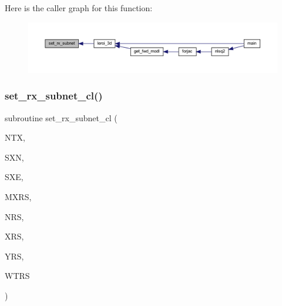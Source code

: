 Here is the caller graph for this function\+:\nopagebreak
\begin{figure}[H]
\begin{center}
\leavevmode
\includegraphics[width=350pt]{Leroi_8f90_a9100f1607055290b050e961c8027016a_icgraph}
\end{center}
\end{figure}
\mbox{\label{Leroi_8f90_a805e33739aa8ba4bfe42148473309ce0}} 
\subsubsection{\texorpdfstring{set\+\_\+rx\+\_\+subnet\+\_\+cl()}{set\_rx\_subnet\_cl()}}
{\footnotesize\ttfamily subroutine set\+\_\+rx\+\_\+subnet\+\_\+cl (\begin{DoxyParamCaption}\item[{integer}]{N\+TX,  }\item[{real, dimension (4,ntx)}]{S\+XN,  }\item[{real, dimension (4,ntx)}]{S\+XE,  }\item[{integer}]{M\+X\+RS,  }\item[{integer, dimension(1,ntx)}]{N\+RS,  }\item[{real, dimension (mxrs,1,ntx)}]{X\+RS,  }\item[{real, dimension (mxrs,1,ntx)}]{Y\+RS,  }\item[{real, dimension (mxrs,1,ntx)}]{W\+T\+RS }\end{DoxyParamCaption})}

